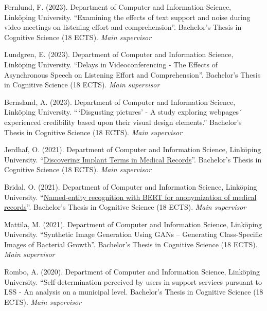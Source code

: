 \documentclass[]{article}
\begin{document}
Fernlund, F. (2023). Department of Computer and Information Science,
Linköping University. ``Examining the effects of text support and noise
during video meetings on listening effort and comprehension''.
Bachelor's Thesis in Cognitive Science (18 ECTS). \emph{Main supervisor}

Lundgren, E. (2023). Department of Computer and Information Science,
Linköping University. ``Delays in Videoconferencing - The Effects of
Asynchronous Speech on Listening Effort and Comprehension''. Bachelor's
Thesis in Cognitive Science (18 ECTS). \emph{Main supervisor}

Bernsland, A. (2023). Department of Computer and Information Science,
Linköping University. ``\,`Disgusting pictures' - A study exploring
webpages´ experienced credibility based upon their visual design
elements.'' Bachelor's Thesis in Cognitive Science (18 ECTS). \emph{Main
supervisor}

Jerdhaf, O. (2021). Department of Computer and Information Science,
Linköping University.
``\href{http://liu.diva-portal.org/smash/record.jsf?dswid=-6296&pid=diva2\%3A1621364&c=1&searchType=SIMPLE&language=sv&query=Jerdhaf&af=\%5B\%5D&aq=\%5B\%5B\%5D\%5D&aq2=\%5B\%5B\%5D\%5D&aqe=\%5B\%5D&noOfRows=50&sortOrder=author_sort_asc&sortOrder2=title_sort_asc&onlyFullText=false&sf=undergraduate}{Discovering
Implant Terms in Medical Records}''. Bachelor's Thesis in Cognitive
Science (18 ECTS). \emph{Main supervisor}

Bridal, O. (2021). Department of Computer and Information Science,
Linköping University.
``\href{http://liu.diva-portal.org/smash/record.jsf?dswid=-6296&faces-redirect=true&language=en&searchType=SIMPLE&query=Marsja&af=\%5B\%5D&aq=\%5B\%5B\%5D\%5D&aq2=\%5B\%5B\%5D\%5D&aqe=\%5B\%5D&pid=diva2\%3A1566701&noOfRows=50&sortOrder=author_sort_asc&sortOrder2=title_sort_asc&onlyFullText=false&sf=undergraduate}{Named-entity
recognition with BERT for anonymization of medical records}''.
Bachelor's Thesis in Cognitive Science (18 ECTS). \emph{Main supervisor}

Mattila, M. (2021). Department of Computer and Information Science,
Linköping University. ``Synthetic Image Generation Using GANs --
Generating Class-Specific Images of Bacterial Growth''. Bachelor's
Thesis in Cognitive Science (18 ECTS). \emph{Main supervisor}

Rombo, A. (2020). Department of Computer and Information Science,
Linköping University. ``Self-determination perceived by users in support
services pursuant to LSS - An analysis on a municipal level. Bachelor's
Thesis in Cognitive Science (18 ECTS). \emph{Main supervisor}
\end{document}
